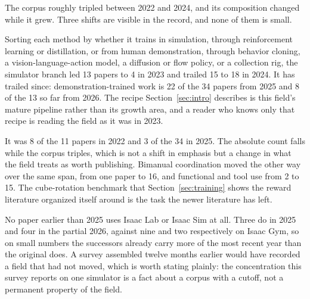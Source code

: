 The corpus roughly tripled between 2022 and 2024, and its composition changed while it grew. Three
shifts are visible in the record, and none of them is small.

Sorting each method by
whether it trains in simulation, through reinforcement learning or distillation, or from human
demonstration, through behavior cloning, a vision-language-action model, a diffusion or flow
policy, or a collection rig, the simulator branch led 13 papers to 4 in 2023 and trailed 15 to 18
in 2024. It has trailed since: demonstration-trained work is 22 of the 34 papers from 2025 and 8
of the 13 so far from 2026. The recipe Section~\ref{sec:intro} describes is this field's mature
pipeline rather than its growth area, and a reader who knows only that recipe is reading the
field as it was in 2023.

It was 8 of the 11
papers in 2022 and 3 of the 34 in 2025. The absolute count falls while the corpus triples,
which is not a shift in emphasis but a change in what the field treats as worth publishing.
Bimanual coordination moved the other way over the same span, from one paper to 16, and functional
and tool use from 2 to 15. The cube-rotation benchmark that Section~\ref{sec:training} shows
the reward literature organized itself around is the task the newer literature has left.

No paper earlier than 2025
uses Isaac Lab or Isaac Sim at all. Three do in 2025 and four in the partial 2026, against nine
and two respectively on Isaac Gym, so on small numbers the successors already carry more of the
most recent year than the original does. A survey assembled twelve months earlier would have
recorded a field that had not moved, which is worth stating plainly: the concentration this
survey reports on one simulator is a fact about a corpus with a cutoff, not a permanent
property of the field.